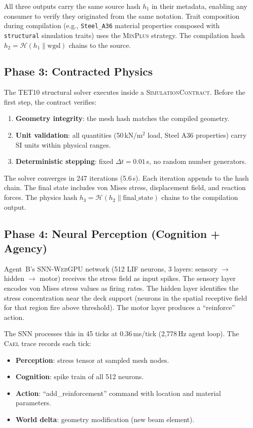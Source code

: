 \documentclass[sigchi-a]{acmart}
\newcommand{\cael}{\textsc{Cael}}
\newcommand{\simcontract}{\textsc{SimulationContract}}
\newcommand{\snnwebgpu}{\textsc{SNN-WebGPU}}
\newcommand{\hashfn}{\mathcal{H}}
\begin{document}
All three outputs carry the same source hash $h_1$ in their metadata,
enabling any consumer to verify they originated from the same notation.
Trait composition during compilation (e.g., \texttt{Steel\_A36} material
properties composed with \texttt{structural} simulation traits) uses the
\textsc{MinPlus} strategy. The compilation hash
$h_2 = \hashfn(h_1 \| \text{wgsl})$ chains to the source.

\subsection{Phase 3: Contracted Physics}

The TET10 structural solver executes inside a \simcontract{}.
Before the first step, the contract verifies:
\begin{enumerate}
  \item \textbf{Geometry integrity}: the mesh hash matches the compiled geometry.
  \item \textbf{Unit validation}: all quantities (50\,kN/m$^2$ load, Steel A36
    properties) carry SI units within physical ranges.
  \item \textbf{Deterministic stepping}: fixed $\Delta t = 0.01$\,s, no
    random number generators.
\end{enumerate}

The solver converges in 247 iterations (5.6\,s). Each iteration appends to
the hash chain. The final state includes von Mises stress, displacement
field, and reaction forces. The physics hash
$h_3 = \hashfn(h_2 \| \text{final\_state})$ chains to the compilation output.

\subsection{Phase 4: Neural Perception (Cognition + Agency)}

Agent~B's \snnwebgpu{} network (512 LIF neurons, 3 layers: sensory
$\to$ hidden $\to$ motor) receives the stress field as input spikes.
The sensory layer encodes von Mises stress values as firing rates.
The hidden layer identifies the stress concentration near the deck
support (neurons in the spatial receptive field for that region fire
above threshold). The motor layer produces a ``reinforce'' action.

The SNN processes this in 45 ticks at 0.36\,ms/tick (2,778\,Hz agent loop).
The \cael{} trace records each tick:
\begin{itemize}
  \item \textbf{Perception}: stress tensor at sampled mesh nodes.
  \item \textbf{Cognition}: spike train of all 512 neurons.
  \item \textbf{Action}: ``add\_reinforcement'' command with location
    and material parameters.
  \item \textbf{World delta}: geometry modification (new beam element).
\end{itemize}
\end{document}
